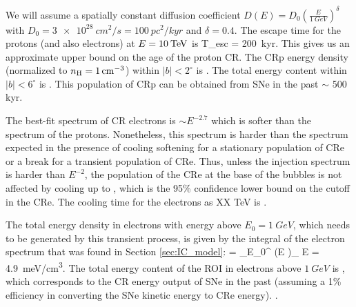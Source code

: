 We will assume a spatially constant diffusion coefficient $D(E) = D_0\left(\frac{E}{\SI{1}{GeV}}\right)^\delta$ with $D_0 = \SI{3e28}{cm^2/s} = \SI{100}{pc^2/kyr}$ and $\delta = 0.4$.
The escape time for the protons (and also electrons) at $E = 10\:{\rm TeV}$ is 
\be
T_{\rm esc} =  \approx \SI{200}{kyr}.
\ee
This gives us an approximate upper bound on the age of the proton CR.
The CRp energy density (normalized to $n_{\text{H}} = \SI{1}{cm^{-3}}$) within $|b| < 2^\circ$ is 
.
The total energy content within $|b| < 6^\circ$ is .
This population of CRp can be obtained from  SNe in the past $\sim$ 500 kyr.


The best-fit spectrum of CR electrons is $\sim E^{-2.7}$ which is softer than the spectrum of the protons.
Nonetheless, this spectrum is harder than the spectrum expected in the presence of cooling softening
for a stationary population of CRe or a break for a transient population of CRe.
Thus, unless the injection spectrum is harder than $E^{-2}$, the population of the CRe at the base of the 
bubbles is not affected by cooling up to , 
which is the 95\% confidence lower bound on the cutoff in the CRe.
The cooling time for the electrons as XX TeV is
.

The total energy density in electrons with energy above $E_0 = \SI{1}{GeV}$, which needs to be generated by this transient process, is given by the integral of the electron spectrum that was found in Section \ref{sec:IC_model}:
\be
{} = \int_{E_0}^{\infty} \left(E \right)_{\!\!\el} \de E = \SI{4.9}{meV/cm^3}.
\ee
{}
The total energy content of the ROI in electrons above $\SI{1}{GeV}$ is , which corresponds to the CR energy output of  SNe  in the past  (assuming a 1\% efficiency in converting the SNe kinetic energy to CRe energy).
.

